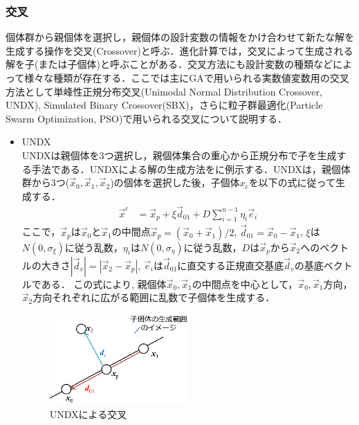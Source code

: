 \subsubsection{交叉}
個体群から親個体を選択し，親個体の設計変数の情報をかけ合わせて新たな解を生成する操作を交叉(Crossover)と呼ぶ．進化計算では，交叉によって生成される解を子(または子個体)と呼ぶことがある．交叉方法にも設計変数の種類などによって様々な種類が存在する．ここでは主にGAで用いられる実数値変数用の交叉方法として単峰性正規分布交叉(Unimodal Normal Distribution Crossover, UNDX)\cite{Kita99, Ono97}, Simulated Binary Crossover(SBX)\cite{Agrawal95}，さらに粒子群最適化(Particle Swarm Optimization, PSO)\cite{Kennedy95}で用いられる交叉について説明する．
\begin{itemize}
    \item UNDX\cite{Kita99, Ono97}\\
          UNDXは親個体を3つ選択し，親個体集合の重心から正規分布で子を生成する手法である．UNDXによる解の生成方法をに例示する．UNDXは，親個体群から3つ($\vec{x}_0, \vec{x}_1, \vec{x}_2$)の個体を選択した後，子個体$x_c$を以下の式に従って生成する．
          \begin{align}
              \vec{x}^{c} & = \vec{x}_p + \xi \vec{d}_{01}+D \sum_{i=1}^{n-1} \eta_i \vec{e}_i
          \end{align}
          ここで，$\vec{x}_p$は$\vec{x}_0$と$\vec{x}_1$の中間点$\vec{x}_p = (\vec{x}_0+\vec{x}_1)/2$, $\vec{d}_{01}=\vec{x}_0-\vec{x}_1$, $\xi$は$N(0, \sigma_\xi)$に従う乱数，$\eta_i$は$N(0, \sigma_\eta)$に従う乱数，$D$は$\vec{x}_p$から$\vec{x}_2$へのベクトルの大きさ$|\vec{d}_v| = |\vec{x}_2-\vec{x}_p|$, $\vec{e}_i$は$\vec{d}_{01}$に直交する正規直交基底$\vec{d}_{v}$の基底ベクトルである．
          この式により, 親個体$\vec{x}_0, \vec{x}_1$の中間点を中心として，$\vec{x}_0, \vec{x}_1$方向，$\vec{x}_2$方向それぞれに広がる範囲に乱数で子個体を生成する．
          \begin{figure}[ht]
              \begin{center}
                  \includegraphics[width=0.5\textwidth,keepaspectratio=true]{fig/theory_undx.eps}
              \end{center}
              \caption{UNDXによる交叉}
              \label{fig::theory_undx}
          \end{figure}


\end{itemize}
